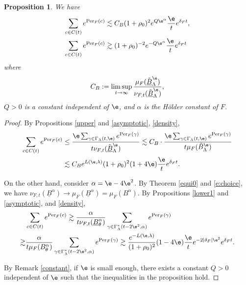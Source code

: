 \documentclass[11pt]{amsart}
\newtheorem{proposition}[theorem]{Proposition}
\theoremstyle{definition}
\def\lB{{\underline B}}
\def\a{\alpha}
\def\c{\gamma}   \def\C{\Gamma}
\def\d{\delta}   %
\def\l{\lambda}   \def\L{\Lambda}
\newcommand{\Per}{\mathrm{Per}}
\begin{document}
\begin{proposition}\label{sumup}
We have
\begin{equation*}
\begin{aligned}
\sum_{c\in C(t)}e^{\Per_F(c)}&\lesssim C_B(1+\rho_0)^{2}e^{Q\e^\a}\frac{\e}{t}e^{\d_Ft},\\
\sum_{c\in C(t)}e^{\Per_F(c)}&\gtrsim (1+\rho_0)^{-2}e^{- Q\e^\a}\frac{\e}{t}e^{\d_Ft}
\end{aligned}
\end{equation*}
where $$C_B:=\limsup_{t\to\infty}\frac{\mu_F(\tilde \lB_\L^\e)}{\nu_{F,t}(\tilde \lB_\L^\e)},$$ 
$Q>0$ is a  constant independent of $\e$, and $\a$ is the H\"{o}lder constant of $F$.
\end{proposition}
\begin{proof}
By Propositions \ref{upper} and \ref{asymptotic}, \eqref{density}, 
\begin{equation*}
\begin{aligned}
\sum_{c\in C(t)}e^{\Per_F(c)}&\le \frac{\e\sum_{\c\in \C_\L(t,\e)}e^{\Per_F(\c)}}{t\nu_{F,t}(\tilde\lB^\e_\L)}\lesssim C_B\cdot\frac{\e\sum_{\c\in \C_\L(t,\e)}e^{\Per_F(\c)}}{t\mu_F(\tilde B^\e_\L)}\\
&\lesssim C_B e^{L(\e,\l)}(1+\rho_0)^2(1+4\e)\frac{\e}{t}e^{\d_Ft}.
\end{aligned}
\end{equation*}

On the other hand, consider $\a=\e-4\e^2$. By Theorem \ref{equi0} and \eqref{e:choice}, we have $\nu_{F,t}(\lB^\a)\to \mu_F(\lB^\a)=\mu_F(B^\a)$. By Propositions \ref{lower1} and \ref{asymptotic}, and \eqref{density},
\begin{equation*}
\begin{aligned}
&\sum_{c\in C(t)}e^{\Per_F(c)}\gtrsim \frac{\a}{t\nu_{F,t}(\lB_{\theta}^{\a})}\sum_{\c\in \C^*_\L(t-2\e^2, \a)}e^{\Per_F(\c)}\\
\gtrsim &\frac{\a}{t\mu_{F}(B_{\theta}^{\a})}\sum_{\c\in \C^*_\L(t-2\e^2, \a)}e^{\Per_F(\c)}
\gtrsim \frac{e^{-L(\e,\l)}}{(1+\rho_0)^2} (1-4\e)\frac{\e}{t}e^{-2|\d_F|\e^2}e^{\d_Ft}.
\end{aligned}
\end{equation*}

By Remark \ref{constant}, if $\e$ is small enough, there exists a constant $Q>0$ independent of $\e$ such that the inequalities in the proposition hold.
\end{proof}
\end{document}
